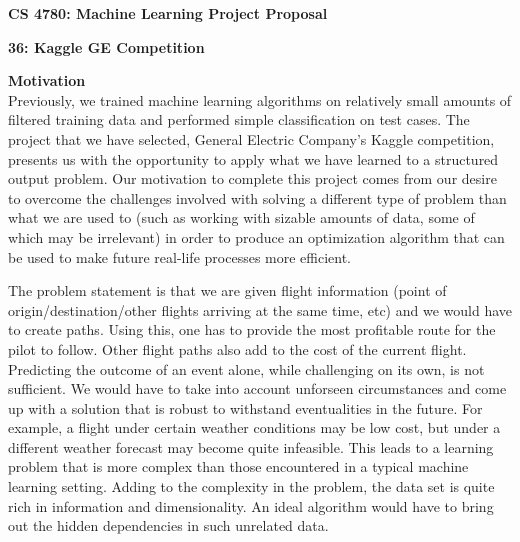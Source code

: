 \documentclass{article}[9pt]
\begin{document}
\begin{framed}
\noindent
\large{\textbf{CS 4780: Machine Learning \hfill Project Proposal}}
\end{framed}
\begin{center}
	\textbf{\Large{36: Kaggle GE Competition}}
\end{center}
\noindent\Large{\textbf{Motivation}}\\
\noindent Previously, we trained machine learning algorithms on relatively small amounts of filtered training data and performed simple classification on test cases. The project that we have selected, General Electric Company's Kaggle competition, presents us with the opportunity to apply what we have learned to a structured output problem. Our motivation to complete this project comes from our desire to overcome the challenges involved with solving a different type of problem than what we are used to (such as working with sizable amounts of data, some of which may be irrelevant) in order to produce an optimization algorithm that can be used to make future real-life processes more efficient.

The problem statement is that we are given flight information (point of origin/destination/other flights arriving at the same time, etc) and we would have to create paths. Using this, one has to provide the most profitable route for the pilot to follow. Other flight paths also add to the cost of the current flight. Predicting the outcome of an event alone, while challenging on its own, is not sufficient. We would have to take into account unforseen circumstances and come up with a solution that is robust to withstand eventualities in the future. For example, a flight under certain weather conditions may be low cost, but under a different weather forecast may become quite infeasible. This leads to a learning problem that is more complex than those encountered in a typical machine learning setting. Adding to the complexity in the problem, the data set is quite rich in information and dimensionality. An ideal algorithm would have to bring out the hidden dependencies in such unrelated data.
\end{document}
